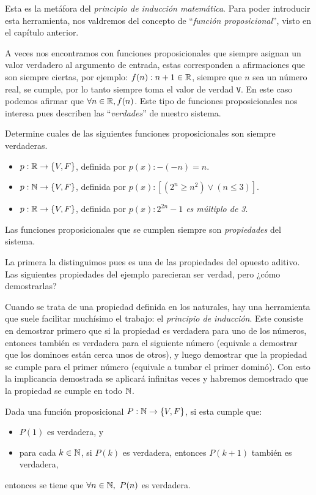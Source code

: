 Esta es la metáfora del \emph{principio de inducción matemática}.
Para poder introducir esta herramienta, nos valdremos del concepto de ``\emph{función proposicional}'', visto en el capítulo anterior.


A veces nos encontramos con funciones proposicionales que siempre asignan un valor verdadero al argumento de entrada, estas corresponden a afirmaciones que son siempre ciertas, por ejemplo: \emph{$f(n):n+1\in\mathbb{R}$}, siempre que $n$ sea un número real, se cumple, por lo tanto siempre toma el valor de verdad {\tt V}.
En este caso podemos afirmar que $\forall n\in\mathbb{R}, f(n)$.
Este tipo de funciones proposicionales nos interesa pues describen las ``\emph{verdades}'' de nuestro sistema.

\medskip

\begin{ejercicio}\label{eje:ind}
Determine cuales de las siguientes funciones proposicionales son siempre verdaderas.
\begin{itemize}
\item $p:\mathbb{R}\rightarrow \{V,F\}$, definida por \emph{$p(x):-(-n)=n$}.
\item $p:\mathbb{N}\rightarrow \{V,F\}$, definida por \emph{$p(x):\left[(2^n\ge n^2)\vee(n\le 3)\right]$}.
\item $p:\mathbb{R}\rightarrow \{V,F\}$, definida por \emph{$p(x):2^{2n}-1$ es múltiplo de 3}.
\end{itemize}

Las funciones proposicionales que se cumplen siempre son \emph{propiedades} del sistema.

La primera la distinguimos pues es una de las propiedades del opuesto aditivo.
Las siguientes propiedades del ejemplo parecieran ser verdad, pero ¿cómo demostrarlas? 
\end{ejercicio}

Cuando se trata de una propiedad definida en los naturales, hay una herramienta que suele facilitar muchísimo el trabajo: el \emph{principio de inducción}.
Este consiste en demostrar primero que si la propiedad es verdadera para uno de los números, entonces también es verdadera para el siguiente número (equivale a demostrar que los dominoes están cerca unos de otros), y luego demostrar que la propiedad se cumple para el primer número (equivale a tumbar el primer dominó).
Con esto la implicancia demostrada se aplicará infinitas veces y habremos demostrado que la propiedad se cumple en todo $\mathbb{N}$.

\medskip

\begin{pp}
Dada una función proposicional $P:\mathbb{N}\rightarrow \{V,F\}$, si esta cumple que:
\begin{itemize}
\item $P(1)$ es verdadera, y
\item para cada $k\in\mathbb{N}$, si $P(k)$ es verdadera, entonces $P(k+1)$ también es verdadera,
\end{itemize}
entonces se tiene que $\forall n\in\N,\ P(n)$ es verdadera.
\end{pp}

